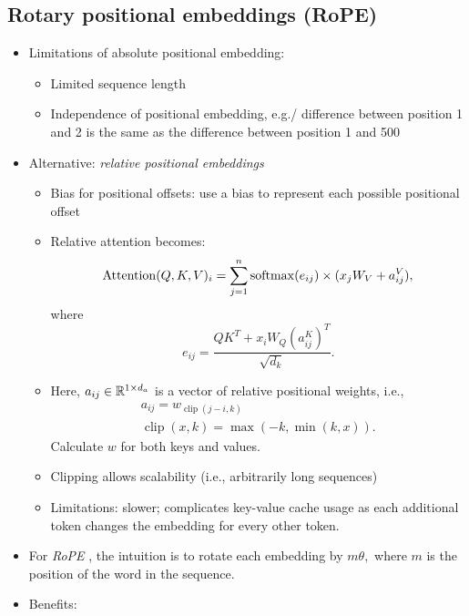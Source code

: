 \subsection{Rotary positional embeddings (RoPE)}
\begin{itemize}
	\item Limitations of absolute positional embedding:
	\begin{itemize}
		\item Limited sequence length
		\item Independence of positional embedding, e.g./ difference between position 1 and 2 is the same as the difference between position 1 and 500
	\end{itemize}
    \item Alternative: \textit{relative positional embeddings} \cite{relposrep}
    \begin{itemize}
        \item Bias for positional offsets: use a bias to represent each possible positional offset
        \item Relative attention becomes:
        \begin{equation*}
            \operatorname{Attention}(Q,K,V)_i = \sum_{j=1}^{n}\operatorname{softmax}(e_{ij}) \times (x_jW_V + a_{ij}^V),
        \end{equation*}
        where
        \begin{equation*}
            e_{ij} = \frac{QK^T + x_iW_Q(a_{ij}^K)^T}{\sqrt{d_k}}.
        \end{equation*}
        \item Here, $a_{ij} \in \mathbb{R}^{1\times d_a}$ is a vector of relative positional weights, i.e.,
        \begin{gather*}
            a_{ij} = w_{\operatorname{clip}(j-i,k)}\\
            \operatorname{clip}(x,k) = \max(-k, \min(k,x)).
        \end{gather*}
        Calculate $w$ for both keys and values.
        \item Clipping allows scalability (i.e., arbitrarily long sequences)
        \item Limitations: slower; complicates key-value cache usage as each additional token changes the embedding for every other token.
    \end{itemize}
    \item For \textit{RoPE} \cite{rotpos}, the intuition is to rotate each embedding by $m \theta,$ where $m$ is the position of the word in the sequence.
    \item Benefits:

\end{itemize}
